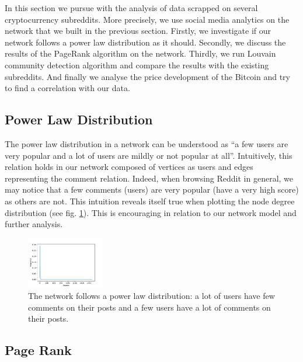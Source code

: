 In this section we pursue with the analysis of data scrapped on several cryptocurrency subreddits. More precisely, we use social media analytics on the network that we built in the previous section. Firstly, we investigate if our network follows a power law distribution as it should. Secondly, we discuss the results of the PageRank algorithm on the network. Thirdly, we run Louvain community detection algorithm and compare the results with the existing subreddits. And finally we analyse the price development of the Bitcoin and try to find a correlation with our data.

\subsection{Power Law Distribution}

The power law distribution in a network can be understood as ``a few users are very popular and a lot of users are mildly or not popular at all''. Intuitively, this relation holds in our network composed of vertices as users and edges representing the comment relation. Indeed, when browsing Reddit in general, we may notice that a few comments (users) are very popular (have a very high score) as others are not. This intuition reveals itself true when plotting the node degree distribution (see fig. \ref{fig:degdist}). This is encouraging in relation to our network model and further analysis.
\begin{figure}[Hb!]
    \centering
    \includegraphics[width=0.3\textwidth]{figures/deg_dist.pdf}
    \caption{The network follows a power law distribution: a lot of users have few comments on their posts and a few users have a lot of comments on their posts.}
    \label{fig:degdist}
\end{figure}



\subsection{Page Rank}

